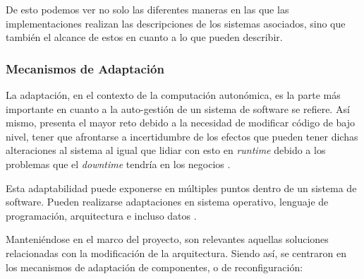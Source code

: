 De esto podemos ver no solo las diferentes maneras en las que las implementaciones realizan las descripciones de los sistemas asociados, sino que también el alcance de estos en cuanto a lo que pueden describir.

\subsubsection{Mecanismos de Adaptación} \label{sec:MecAdap}


La adaptación, en el contexto de la computación autonómica, es la parte más importante en cuanto a la auto-gestión de un sistema de software se refiere. Así mismo, presenta el mayor reto debido a la necesidad de modificar código de bajo nivel, tener que afrontarse a incertidumbre de los efectos que pueden tener dichas alteraciones al sistema al igual que lidiar con esto en \textit{runtime} debido a los problemas que el \textit{downtime} tendría en los negocios \cite{lalanda_diaconescu_mccann_2014}. 

Esta adaptabilidad puede exponerse en múltiples puntos dentro de un sistema de software. Pueden realizarse adaptaciones en sistema operativo, lenguaje de programación, arquitectura e incluso datos \cite{lalanda_diaconescu_mccann_2014}. 

Manteniéndose en el marco del proyecto, son relevantes aquellas soluciones relacionadas con la modificación de la arquitectura. Siendo así, se centraron en los mecanismos de adaptación de componentes, o de reconfiguración:


